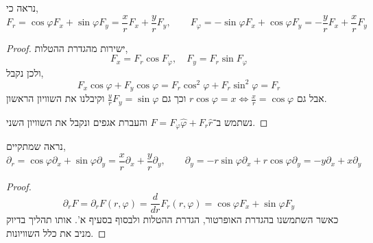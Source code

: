 \subquestion{}
נראה כי,
\[
	F_r
	= \cos \varphi F_x + \sin \varphi F_y
	= \frac{x}{r} F_x + \frac{y}{r} F_y,
	\qquad
	F_{\varphi} = - \sin \varphi F_x + \cos \varphi F_y
	= - \frac{y}{r} F_x + \frac{x}{r} F_y
\]
\begin{proof}
	ישירות מהגדרת ההטלות,
	\[
		F_x
		= F_r \cos F_\varphi,
		\quad
		F_y
		= F_r \sin F_\varphi
	\]
	ולכן נקבל,
	\[
		F_x \cos \varphi + F_y \cos \varphi
		= F_r \cos^2 \varphi + F_r \sin^2 \varphi
		= F_r 
	\]
	אבל גם $r \cos \varphi = x \iff \frac{x}{r} = \cos \varphi$ וכך גם $\frac{y}{r} F_y = \sin \varphi$ וקיבלנו את השוויון הראשון.

	נשתמש ב־$F = F_\varphi \hat{\varphi} + F_r \hat{r}$ והעברת אגפים ונקבל את השוויון השני.
\end{proof}

\subquestion{}
נראה שמתקיים,
\[
	\partial_r
	= \cos \varphi \partial_x + \sin \varphi \partial_y
	= \frac{x}{r} \partial_x + \frac{y}{r} \partial_y,
	\qquad
	\partial_y
	= -r \sin \varphi \partial_x + r \cos \varphi \partial_y
	= -y \partial_x + x \partial_y
\]
\begin{proof}
	\[
		\partial_r F
		= \partial_r F(r, \varphi)
		= \frac{d}{dr} F_r(r, \varphi)
		= \cos \varphi F_x + \sin \varphi F_y
	\]
	כאשר השתמשנו בהגדרת האופרטור, הגדרת ההטלות ולבסוף בסעיף א'.
	אותו תהליך בדיוק מניב את כלל השוויונות.
\end{proof}

